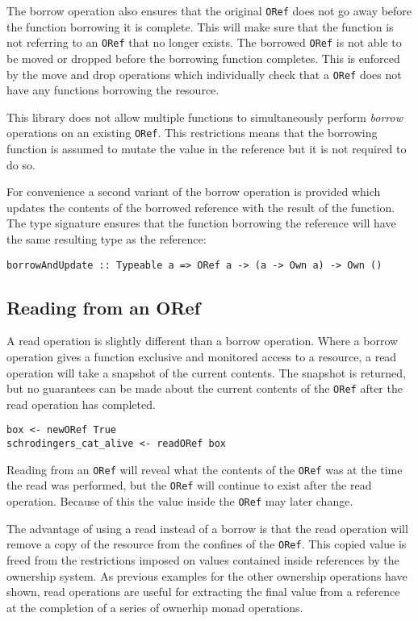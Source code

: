 \documentclass[onehalf,11pt]{beavtex}
\begin{document}
The borrow operation also ensures that the original \texttt{ORef} does not
go away before the function borrowing it is complete. This will make sure that
the function is not referring to an \texttt{ORef} that no longer exists.
The borrowed \texttt{ORef} is not able to be moved or dropped before the
borrowing function completes.
This is enforced by the move and drop operations which individually
check that a \texttt{ORef} does not have any functions borrowing the resource.

This library does not allow multiple functions to simultaneously perform
\textit{borrow} operations on an existing \texttt{ORef}.
This restrictions means that the borrowing function is assumed to mutate the
value in the reference but it is not required to do so.

For convenience a second variant of the borrow operation is provided which
updates the contents of the borrowed reference with the result of the function. 
The type signature ensures that the function borrowing the reference will
have the same resulting type as the reference:

\begin{verbatim}
borrowAndUpdate :: Typeable a => ORef a -> (a -> Own a) -> Own ()
\end{verbatim}


\subsection{Reading from an ORef}

A read operation is slightly different than a borrow operation. Where a borrow
operation gives a function exclusive and monitored access to a resource, a read
operation will take a snapshot of the current contents. The snapshot is
returned, but no guarantees can be made about the current contents of the
\texttt{ORef} after the read operation has completed.

\begin{lstlisting}
box <- newORef True
schrodingers_cat_alive <- readORef box
\end{lstlisting}

Reading from an \texttt{ORef} will reveal what the contents of the \texttt{ORef}
was at the time the read was performed, but the \texttt{ORef} will continue to
exist after the read operation. Because of this the value inside
the \texttt{ORef} may later change.

The advantage of using a read instead of a borrow is that the read operation
will remove a copy of the resource from the confines of the \texttt{ORef}.
This copied value is freed from the restrictions imposed on values contained
inside references by the ownership system.
As previous examples for the other ownership operations have shown, read
operations are useful for extracting the final value from a reference at the
completion of a series of ownerhip monad operations.
\end{document}
